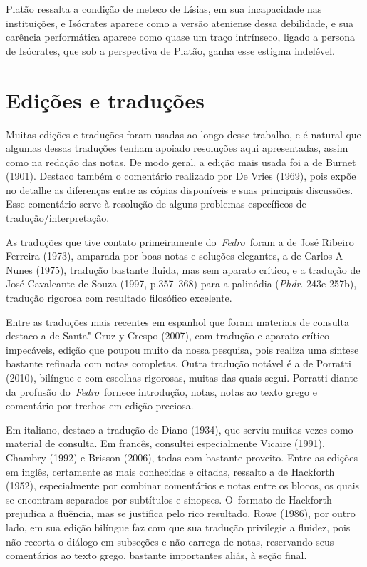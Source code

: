 Platão ressalta a condição de meteco de Lísias, em sua incapacidade nas
instituições, e Isócrates aparece como a versão ateniense dessa
debilidade, e sua carência performática aparece como quase um traço
intrínseco, ligado a persona de Isócrates, que sob a perspectiva de
Platão, ganha esse estigma indelével.

 

\section{Edições e traduções}

 

Muitas edições e traduções foram usadas ao longo desse trabalho, e é
natural que algumas dessas traduções tenham apoiado resoluções aqui
apresentadas, assim como na redação das notas. De modo geral, a edição
mais usada foi a de Burnet (1901). Destaco também o comentário realizado
por De Vries (1969), pois expõe no detalhe as diferenças entre as cópias
disponíveis e suas principais discussões. Esse comentário serve à
resolução de alguns problemas específicos de tradução/\allowbreak{}interpretação.

As traduções que tive contato primeiramente do~\emph{Fedro}~foram a de
José Ribeiro Ferreira (1973), amparada por boas notas e soluções
elegantes, a de Carlos A\,Nunes (1975), tradução bastante fluida, mas
sem aparato crítico, e a tradução de José Cavalcante de Souza (1997,
p.357--368) para a palinódia (\emph{Phdr}. 243e-257b), tradução rigorosa
com resultado filosófico excelente.

Entre as traduções mais recentes em espanhol que foram materiais de
consulta destaco a de Santa"-Cruz y Crespo (2007), com tradução e aparato
crítico impecáveis, edição que poupou muito da nossa pesquisa, pois
realiza uma síntese bastante refinada com notas completas. Outra
tradução notável é a de Porratti (2010), bilíngue e com escolhas
rigorosas, muitas das quais segui. Porratti diante da profusão
do~\emph{Fedro}~fornece introdução, notas, notas ao texto grego e
comentário por trechos em edição preciosa.

Em italiano, destaco a tradução de Diano (1934), que serviu muitas vezes
como material de consulta. Em francês, consultei especialmente Vicaire
(1991), Chambry (1992) e Brisson (2006), todas com bastante proveito.
Entre as edições em inglês, certamente as mais conhecidas e citadas,
ressalto a de Hackforth (1952), especialmente por combinar comentários e
notas entre os blocos, os quais se encontram separados por subtítulos e
sinopses. O~formato de Hackforth prejudica a fluência, mas se justifica
pelo rico resultado. Rowe (1986), por outro lado, em sua edição bilíngue
faz com que sua tradução privilegie a fluidez, pois não recorta o
diálogo em subseções e não carrega de notas, reservando seus comentários
ao texto grego, bastante importantes aliás, à seção final.


